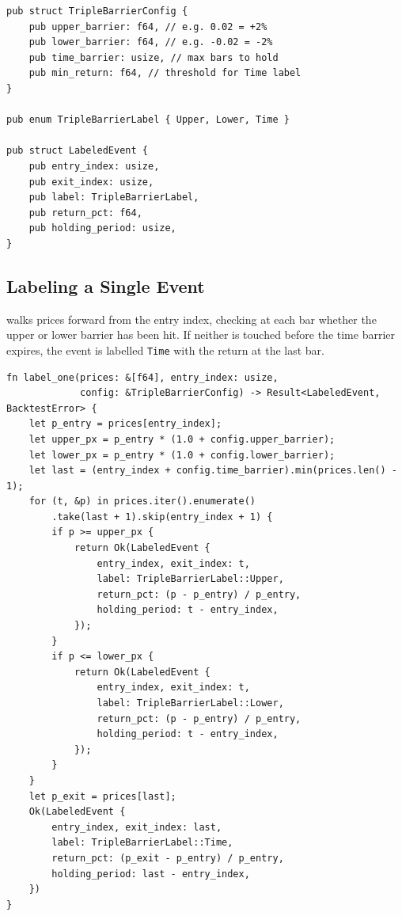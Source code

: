 \begin{lstlisting}[caption={Triple-barrier configuration and label type}]
pub struct TripleBarrierConfig {
    pub upper_barrier: f64, // e.g. 0.02 = +2%
    pub lower_barrier: f64, // e.g. -0.02 = -2%
    pub time_barrier: usize, // max bars to hold
    pub min_return: f64, // threshold for Time label
}

pub enum TripleBarrierLabel { Upper, Lower, Time }

pub struct LabeledEvent {
    pub entry_index: usize,
    pub exit_index: usize,
    pub label: TripleBarrierLabel,
    pub return_pct: f64,
    pub holding_period: usize,
}
\end{lstlisting}

\subsection{Labeling a Single Event}

 walks prices forward from the entry index, checking
at each bar whether the upper or lower barrier has been hit. If neither
is touched before the time barrier expires, the event is labelled
\texttt{Time} with the return at the last bar.


\begin{lstlisting}[caption={Walking the price path to find the first barrier hit}]
fn label_one(prices: &[f64], entry_index: usize,
             config: &TripleBarrierConfig) -> Result<LabeledEvent, BacktestError> {
    let p_entry = prices[entry_index];
    let upper_px = p_entry * (1.0 + config.upper_barrier);
    let lower_px = p_entry * (1.0 + config.lower_barrier);
    let last = (entry_index + config.time_barrier).min(prices.len() - 1);
    for (t, &p) in prices.iter().enumerate()
        .take(last + 1).skip(entry_index + 1) {
        if p >= upper_px {
            return Ok(LabeledEvent {
                entry_index, exit_index: t,
                label: TripleBarrierLabel::Upper,
                return_pct: (p - p_entry) / p_entry,
                holding_period: t - entry_index,
            });
        }
        if p <= lower_px {
            return Ok(LabeledEvent {
                entry_index, exit_index: t,
                label: TripleBarrierLabel::Lower,
                return_pct: (p - p_entry) / p_entry,
                holding_period: t - entry_index,
            });
        }
    }
    let p_exit = prices[last];
    Ok(LabeledEvent {
        entry_index, exit_index: last,
        label: TripleBarrierLabel::Time,
        return_pct: (p_exit - p_entry) / p_entry,
        holding_period: last - entry_index,
    })
}
\end{lstlisting}


